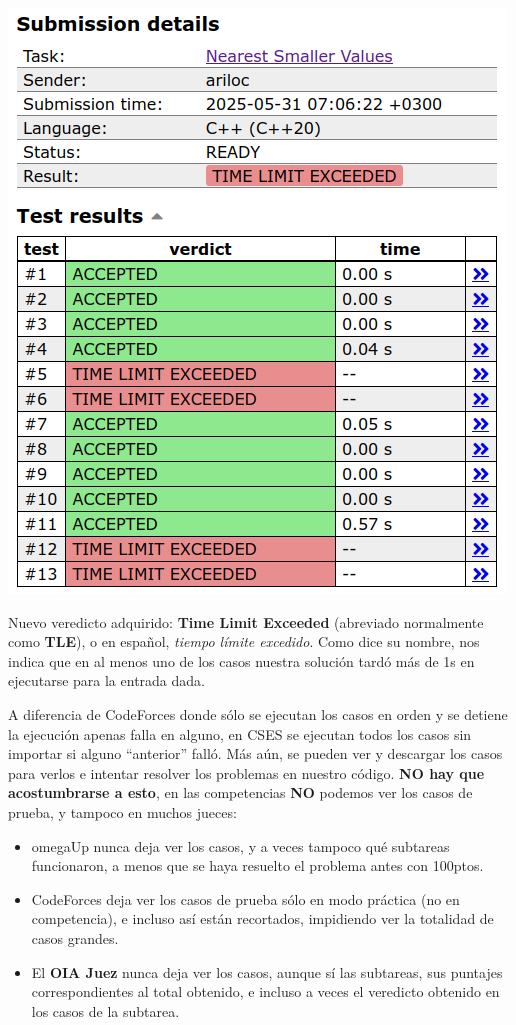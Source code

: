 \documentclass{beamer}
\begin{document}
    \begin{frame}[noframenumbering]
        \begin{center}
            \includegraphics[width=.4\linewidth]{./cses_tle.png}
        \end{center}
        \pause

        Nuevo veredicto adquirido: \textbf{Time Limit Exceeded} (abreviado normalmente como \textbf{TLE}), o en español, \textit{tiempo límite excedido}. Como dice su nombre, nos indica que en al menos uno de los casos nuestra solución tardó más de 1s en ejecutarse para la entrada dada.
    \end{frame}

    \begin{frame}[noframenumbering]
        A diferencia de CodeForces donde sólo se ejecutan los casos en orden y se detiene la ejecución apenas falla en alguno, en CSES se ejecutan todos los casos sin importar si alguno ``anterior'' falló. \pause Más aún, se pueden ver y descargar los casos para verlos e intentar resolver los problemas en nuestro código. \pause \textbf{NO hay que acostumbrarse a esto}, en las competencias \textbf{NO} podemos ver los casos de prueba, y tampoco en muchos jueces: \pause

        \begin{itemize}
            \item omegaUp nunca deja ver los casos, y a veces tampoco qué subtareas funcionaron, a menos que se haya resuelto el problema antes con 100ptos. \pause
            \item CodeForces deja ver los casos de prueba sólo en modo práctica (no en competencia), e incluso así están recortados, impidiendo ver la totalidad de casos grandes.\pause
            \item El \textbf{OIA Juez} nunca deja ver los casos, aunque sí las subtareas, sus puntajes correspondientes al total obtenido, e incluso a veces el veredicto obtenido en los casos de la subtarea.
        \end{itemize}
    \end{frame}
\end{document}
